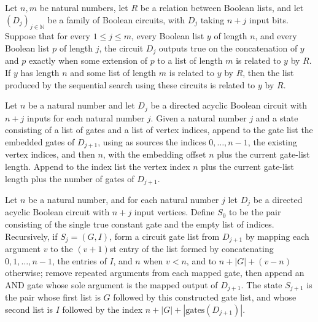 \begin{theorem}
\label{BoolCircuit.searchBits_spec}
\leanok
{}
Let $n,m$ be natural numbers, let $R$ be a relation between Boolean lists, and let
$(D_j)_{j\in\mathbb N}$ be a family of Boolean circuits, with $D_j$ taking $n+j$ input
bits. Suppose that for every $1\le j\le m$, every Boolean list $y$ of length $n$, and
every Boolean list $p$ of length $j$, the circuit $D_j$ outputs true on the
concatenation of $y$ and $p$ exactly when some extension of $p$ to a list of length $m$
is related to $y$ by $R$. If $y$ has length $n$ and some list of length $m$ is related
to $y$ by $R$, then the list produced by the sequential search using these circuits is
related to $y$ by $R$.
\end{theorem}

\begin{definition}
\label{BoolCircuit.searchStep}
\leanok
{}
Let $n$ be a natural number and let $D_j$ be a directed acyclic Boolean circuit with
$n+j$ inputs for each natural number $j$. Given a natural number $j$ and a state
consisting of a list of gates and a list of vertex indices, append to the gate list the
embedded gates of $D_{j+1}$, using as sources the indices $0,\ldots,n-1$, the existing
vertex indices, and then $n$, with the embedding offset $n$ plus the current gate-list
length. Append to the index list the vertex index $n$ plus the current gate-list length
plus the number of gates of $D_{j+1}$.
\end{definition}

\begin{definition}
\label{BoolCircuit.searchState}
\leanok
{}
Let $n$ be a natural number, and for each natural number $j$ let $D_j$ be a directed
acyclic Boolean circuit with $n+j$ input vertices. Define $S_0$ to be the pair
consisting of the single true constant gate and the empty list of indices. Recursively,
if $S_j=(G,I)$, form a circuit gate list from $D_{j+1}$ by mapping each argument $v$ to
the $(v+1)$st entry of the list formed by concatenating $0,1,\ldots,n-1$, the entries of
$I$, and $n$ when $v<n$, and to $n+|G|+(v-n)$ otherwise; remove repeated arguments from
each mapped gate, then append an AND gate whose sole argument is the mapped output of
$D_{j+1}$. The state $S_{j+1}$ is the pair whose first list is $G$ followed by this
constructed gate list, and whose second list is $I$ followed by the index
$n+|G|+|\mathrm{gates}(D_{j+1})|$.
\end{definition}

